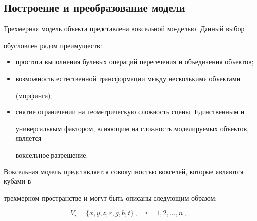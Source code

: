 \subsection{Построение и преобразование модели} %


Трехмерная модель объекта представлена воксельной мо-\linebreak делью. Данный выбор 


обусловлен рядом преимуществ:


\begin{itemize}


\item простота выполнения булевых операций пересечения и объединения объектов;


\item возможность естественной трансформации между несколькими объектами 


(морфинга);


\item снятие ограничений на геометрическую сложность сцены. Единственным и 


универсальным фактором, влияющим на сложность моделируемых объектов, является 


воксельное разрешение.


\end{itemize}





Воксельная модель представляется совокупностью вокселей, которые являются кубами в 


трехмерном пространстве и могут быть описаны следующим образом:


$$


V_i=\{x,y,z,r,g,b,t\}\,,\quad i=1,2,\ldots , n\,,


$$










